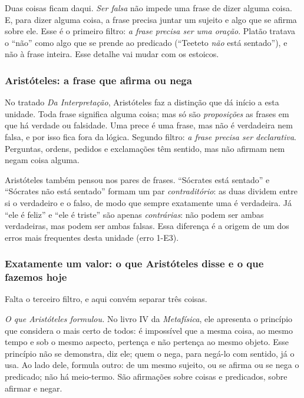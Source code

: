 Duas coisas ficam daqui. \emph{Ser falsa} não impede uma frase de dizer alguma coisa. E, para dizer alguma coisa, a frase precisa juntar um sujeito e algo que se afirma sobre ele. Esse é o primeiro filtro: \emph{a frase precisa ser uma oração}. Platão tratava o \enquote{não} como algo que se prende ao predicado (\enquote{Teeteto \emph{não} está sentado}), e não à frase inteira. Esse detalhe vai mudar com os estoicos.

\subsubsection{Aristóteles: a frase que afirma ou nega}
No tratado \emph{Da Interpretação}, Aristóteles faz a distinção que dá início a esta unidade. Toda frase significa alguma coisa; mas só são \emph{proposições} as frases em que há verdade ou falsidade. Uma prece é uma frase, mas não é verdadeira nem falsa, e por isso fica fora da lógica. Segundo filtro: \emph{a frase precisa ser declarativa}. Perguntas, ordens, pedidos e exclamações têm sentido, mas não afirmam nem negam coisa alguma.

Aristóteles também pensou nos pares de frases. \enquote{Sócrates está sentado} e \enquote{Sócrates não está sentado} formam um par \emph{contraditório}: as duas dividem entre si o verdadeiro e o falso, de modo que sempre exatamente uma é verdadeira. Já \enquote{ele é feliz} e \enquote{ele é triste} são apenas \emph{contrárias}: não podem ser ambas verdadeiras, mas podem ser ambas falsas. Essa diferença é a origem de um dos erros mais frequentes desta unidade (erro 1-E3).

\subsubsection{Exatamente um valor: o que Aristóteles disse e o que fazemos hoje}
Falta o terceiro filtro, e aqui convém separar três coisas.

\emph{O que Aristóteles formulou.} No livro IV da \emph{Metafísica}, ele apresenta o princípio que considera o mais certo de todos: é impossível que a mesma coisa, ao mesmo tempo e sob o mesmo aspecto, pertença e não pertença ao mesmo objeto. Esse princípio não se demonstra, diz ele; quem o nega, para negá-lo com sentido, já o usa. Ao lado dele, formula outro: de um mesmo sujeito, ou se afirma ou se nega o predicado; não há meio-termo. São afirmações sobre coisas e predicados, sobre afirmar e negar.


